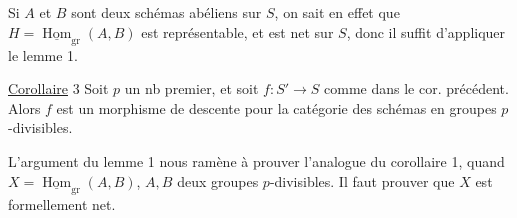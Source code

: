 Si $A$ et $B$ sont deux schémas abéliens sur $S$, on sait en effet que $H=\underline{\operatorname{Hom}}_{\mathrm{gr}}(A,B)$ est représentable, et est net sur $S$, donc il suffit d'appliquer le lemme 1.

\uline{Corollaire} 3 Soit $p$ un nb premier, et soit $f:S'\to S$ comme dans le cor. précédent. Alors $f$ est un morphisme de descente pour la catégorie des  schémas en groupes $p$-divisibles.

L'argument  du lemme 1 nous ramène à prouver l'analogue du corollaire 1, quand $X=\underline{\operatorname{Hom}}_{\mathrm{gr}}(A,B)$, $A,B$ deux groupes $p$-divisibles. Il faut prouver que $X$ est formellement net.

